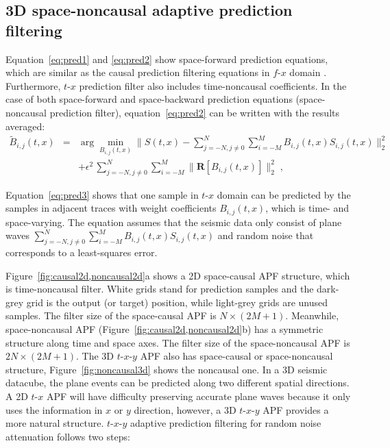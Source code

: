 \subsection{3D space-noncausal adaptive prediction filtering}
Equation~\ref{eq:pred1} and \ref{eq:pred2} show space-forward
prediction equations, which are similar as the causal prediction
filtering equations in $f$-$x$ domain \cite[]{Gulunay00}. Furthermore,
$t$-$x$ prediction filter also includes time-noncausal
coefficients. In the case of both space-forward and space-backward
prediction equations (space-noncausal prediction filter),
equation~\ref{eq:pred2} can be written
\cite[]{GEO56-06-07850794,Naghizadeh09,Liu12,Liu13} with the results
averaged: 
{\setlength\arraycolsep{2pt}
\begin{eqnarray}
  \label{eq:pred3}
\tilde{B}_{i,j}(t,x) &=& \arg\min_{B_{i,j}(t,x)}\|S(t,x)-
  \sum_{j=-N,j\neq0}^{N} \sum_{i=-M}^{M}
   B_{i,j}(t,x)S_{i,j}(t,x)\|_2^2 \nonumber \\
  & & + \epsilon^2\, \sum_{j=-N,j\neq0}^{N} \sum_{i=-M}^{M} 
  \|\mathbf{R}[B_{i,j}(t,x)]\|_2^2\;,
\end{eqnarray}}

Equation~\ref{eq:pred3} shows that one sample in $t$-$x$ domain can be
predicted by the samples in adjacent traces with weight coefficients
$B_{i,j}(t,x)$, which is time- and space-varying. The equation assumes
that the seismic data only consist of plane waves
$\sum_{j=-N,j\neq0}^{N}
\sum_{i=-M}^{M} B_{i,j}(t,x)S_{i,j}(t,x)$ and random noise
that corresponds to a least-squares error.

Figure~\ref{fig:causal2d,noncausal2d}a shows a 2D space-causal APF
structure, which is time-noncausal filter. White grids stand for
prediction samples and the dark-grey grid is the output (or target)
position, while light-grey grids are unused samples. The filter size
of the space-causal APF is $N\times(2M+1)$. Meanwhile, space-noncausal
APF (Figure~\ref{fig:causal2d,noncausal2d}b) has a symmetric structure
along time and space axes. The filter size of the space-noncausal APF
is $2N\times(2M+1)$. The 3D $t$-$x$-$y$ APF also has space-causal or
space-noncausal structure, Figure~\ref{fig:noncausal3d} shows the
noncausal one. In a 3D seismic datacube, the plane events can be
predicted along two different spatial directions. A 2D $t$-$x$ APF
will have difficulty preserving accurate plane waves because it only
uses the information in $x$ or $y$ direction, however, a 3D
$t$-$x$-$y$ APF provides a more natural structure. $t$-$x$-$y$
adaptive prediction filtering for random noise attenuation follows two
steps:

